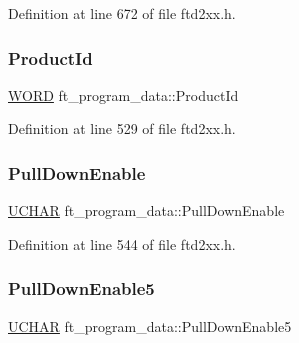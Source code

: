 Definition at line 672 of file ftd2xx.\+h.

\mbox{\label{structft__program__data_a623b7980fadab4322ed41da598b45397}} 
\subsubsection{\texorpdfstring{Product\+Id}{ProductId}}
{\footnotesize\ttfamily \hyperlink{CatCaloProto40MHz_2inc_2WinTypes_8h_a197942eefa7db30960ae396d68339b97}{W\+O\+RD} ft\+\_\+program\+\_\+data\+::\+Product\+Id}



Definition at line 529 of file ftd2xx.\+h.

\mbox{\label{structft__program__data_a922454432fb9098f4ce4cb6675be85e6}} 
\subsubsection{\texorpdfstring{Pull\+Down\+Enable}{PullDownEnable}}
{\footnotesize\ttfamily \hyperlink{CatCaloProto40MHz_2inc_2WinTypes_8h_a4f4bb67531a9bf6f0b9c6ad76aeba587}{U\+C\+H\+AR} ft\+\_\+program\+\_\+data\+::\+Pull\+Down\+Enable}



Definition at line 544 of file ftd2xx.\+h.

\mbox{\label{structft__program__data_a24f71286b69d74eb238a97a2643e8dba}} 
\subsubsection{\texorpdfstring{Pull\+Down\+Enable5}{PullDownEnable5}}
{\footnotesize\ttfamily \hyperlink{CatCaloProto40MHz_2inc_2WinTypes_8h_a4f4bb67531a9bf6f0b9c6ad76aeba587}{U\+C\+H\+AR} ft\+\_\+program\+\_\+data\+::\+Pull\+Down\+Enable5}



